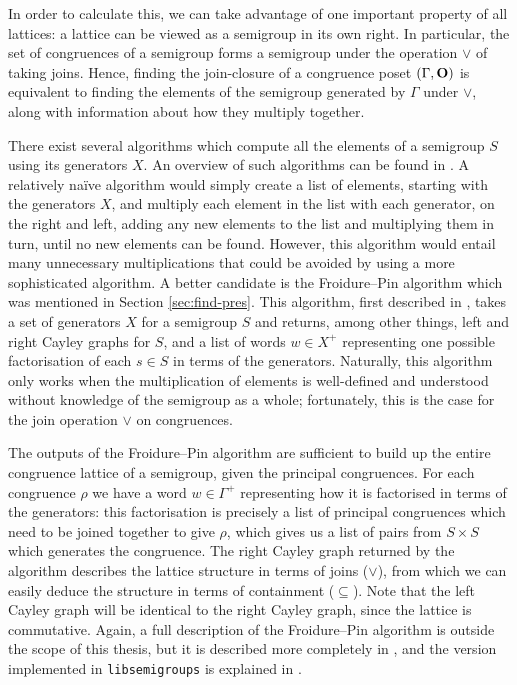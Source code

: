 In order to calculate this, we can take advantage of one important property of
all lattices: a lattice can be viewed as a semigroup in its own right.  In
particular, the set of congruences of a semigroup forms a semigroup under the
operation $\vee$ of taking joins.  Hence, finding the join-closure of a
congruence poset $(\Gamma, \mathbf{O})$ is equivalent to finding the elements of the
semigroup generated by $\Gamma$ under $\vee$, along with information about how
they multiply together.

There exist several algorithms which compute all the elements of a semigroup $S$
using its generators $X$.  An overview of such algorithms can be found in
\cite[\S1]{computing_finite_semigroups}.  A relatively na\"ive algorithm would
simply create a list of elements, starting with the generators $X$, and multiply
each element in the list with each generator, on the right and left, adding any
new elements to the list and multiplying them in turn, until no new elements can
be found.  However, this algorithm would entail many unnecessary multiplications
that could be avoided by using a more sophisticated algorithm.  A better
candidate is the Froidure--Pin algorithm which was mentioned in Section
\ref{sec:find-pres}.  This algorithm, first described in \cite{froidure_pin},
takes a set of generators $X$ for a semigroup $S$ and returns, among other
things, left and right Cayley graphs for $S$, and a list of words $w \in X^+$
representing one possible factorisation of each $s \in S$ in terms of the
generators.  Naturally, this algorithm only works when the multiplication of
elements is well-defined and understood without knowledge of the semigroup as a
whole; fortunately, this is the case for the join operation $\vee$ on
congruences.

The outputs of the Froidure--Pin algorithm are sufficient to build up the entire
congruence lattice of a semigroup, given the principal congruences.  For each
congruence $\rho$ we have a word $w \in \Gamma^+$ representing how it is
factorised in terms of the generators: this factorisation is precisely a list of
principal congruences which need to be joined together to give $\rho$, which
gives us a list of pairs from $S \times S$ which generates the congruence.  The
right Cayley graph returned by the algorithm describes the lattice structure in
terms of joins ($\vee$), from which we can easily deduce the structure in terms
of containment ($\subseteq$).  Note that the left Cayley graph will be identical
to the right Cayley graph, since the lattice is commutative.  Again, a full
description of the Froidure--Pin algorithm is outside the scope of this thesis,
but it is described more completely in \cite{froidure_pin}, and the version
implemented in \texttt{libsemigroups} is explained in
\cite{froidure_pin_jonusas}.

